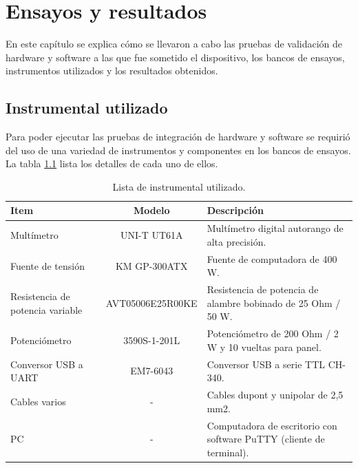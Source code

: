 
\chapter{Ensayos y resultados} %

\label{Chapter4} %


En este capítulo se explica cómo se llevaron a cabo las pruebas de validación de hardware y software a las que fue sometido el dispositivo, los bancos de ensayos, instrumentos utilizados y los resultados obtenidos.

\section{Instrumental utilizado}

Para poder ejecutar las pruebas de integración de hardware y software se requirió del uso de una variedad de instrumentos y componentes en los bancos de ensayos. La tabla \ref{tab:instrumentos} lista los detalles de cada uno de ellos.

\begin{table}[H]
	\centering
	\caption{Lista de instrumental utilizado.}
	\begin{tabular}{p{3cm} c p{6cm}}
		\toprule
		\textbf{Item} & \textbf{Modelo} & \textbf{Descripción} \\
		\midrule
		Multímetro			& UNI-T UT61A		& Multímetro digital autorango de alta precisión. \\
		Fuente de tensión	& KM GP-300ATX		& Fuente de computadora de 400 W. \\
		Resistencia de potencia variable		& AVT05006E25R00KE	& Resistencia de potencia de alambre bobinado de 25 Ohm / 50 W. \\
		Potenciómetro							& 3590S-1-201L & Potenciómetro de 200 Ohm / 2 W y 10 vueltas para panel. \\
		Conversor USB a UART					& EM7-6043		& Conversor USB a serie TTL CH-340. \\
		Cables varios							& - 			& Cables dupont y unipolar de 2,5 mm2. \\
		PC										& -				& Computadora de escritorio con software PuTTY (cliente de terminal). \\
		\bottomrule
		\hline
	\end{tabular}
	\label{tab:instrumentos}
\end{table}

